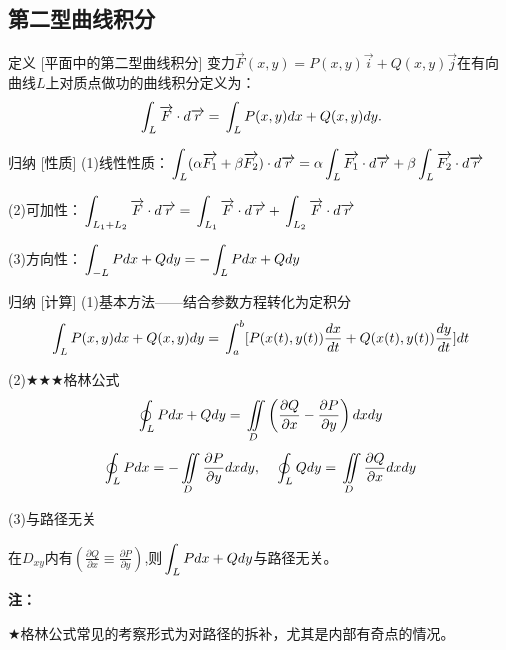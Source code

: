 \documentclass[a4paper,12pt,oneside,fontset=none]{ctexbook}
\let\oldint\int
\renewcommand{\int}{\displaystyle{\vrule width 0pt height 0em depth 0em}\oldint}
\let\oldiint\iint
\renewcommand{\iint}{\displaystyle{\vrule width 0pt height 0em depth 0em}\oldiint}
\let\oldoint\oint
\renewcommand{\oint}{\displaystyle{\vrule width 0pt height 1.5em depth 1.5em}\oldoint}
\newenvironment{induction}[1][]{\begin{thmBox}{归纳}{#1}}{\end{thmBox}}
\newcounter{definition}[chapter]
\newenvironment{definition}[1][]{\begin{defBox}{定义}{#1}}{\end{defBox}}
\newenvironment{note}{
    \par\vspace{0.5em}\noindent
    \textbf{\color{NoteColor} 注：}
}{
    \par\vspace{0.5em}
}
\numberwithin{equation}{chapter}
\begin{document}
\subsection{第二型曲线积分}
\begin{definition}
    [平面中的第二型曲线积分]
    变力$\overrightarrow{F}(x,y) = P(x,y)\overrightarrow{i} + Q(x,y)\overrightarrow{j}$在有向曲线$L$上对质点做功的曲线积分定义为：
    $$\int_L \overrightarrow{F} \cdot d\overrightarrow{r} = \int_L P(x,y)dx + Q(x,y)dy.$$
\end{definition}
\begin{induction}
    [性质]
    (1)线性性质：$\int_L (\alpha \overrightarrow{F_1} + \beta \overrightarrow{F_2}) \cdot d\overrightarrow{r} = \alpha \int_L \overrightarrow{F_1} \cdot d\overrightarrow{r} + \beta \int_L \overrightarrow{F_2} \cdot d\overrightarrow{r}$

    (2)可加性：$\int_{L_1+L_2} \overrightarrow{F} \cdot d\overrightarrow{r} = \int_{L_1} \overrightarrow{F} \cdot d\overrightarrow{r} + \int_{L_2} \overrightarrow{F} \cdot d\overrightarrow{r}$

    (3)方向性：$\int_{-L} Pdx + Qdy = -\int_L Pdx + Qdy$
\end{induction}
\begin{induction}
    [计算]
    (1)基本方法——结合参数方程转化为定积分
    $$\int_L P(x,y)dx + Q(x,y)dy = \int_a^b [P(x(t),y(t))\frac{dx}{dt} + Q(x(t),y(t))\frac{dy}{dt}] dt$$
    
    (2)$\bigstar\bigstar\bigstar$格林公式
    $$\oint_{L} Pdx + Qdy = \iint\limits_{D} \left(\frac{\partial Q}{\partial x} - \frac{\partial P}{\partial y}\right) dxdy$$
    $$\oint_{L} Pdx = -\iint\limits_{D} \frac{\partial P}{\partial y} dxdy,\quad \oint_{L} Qdy = \iint\limits_{D} \frac{\partial Q}{\partial x} dxdy$$
    
    (3)与路径无关

    在$D_{xy}$内有$\left(\frac{\partial Q}{\partial x} \equiv  \frac{\partial P}{\partial y}\right)$,则$\int_L Pdx + Qdy$与路径无关。
\end{induction}
\begin{note}
    $\bigstar$格林公式常见的考察形式为对路径的拆补，尤其是内部有奇点的情况。
\end{note}
\end{document}
